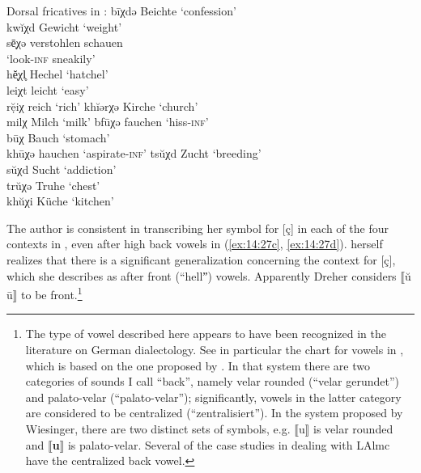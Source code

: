 \ea%
\label{ex:14:27}Dorsal fricatives in :
\ea\label{ex:14:27a} bīχdə \tab [biːçdə] \tab Beichte \tab ‘confession’ \\
    kwĭχd \tab [kvɪçd] \tab Gewicht \tab ‘weight’ \\
    sē̜χə \tab [sɛːçə] \tab verstohlen schauen\\
    \tab \tab  ‘look\textsc{{}-inf} sneakily’ \\
    hĕͅχl̥ \tab [hɛçl̩] \tab Hechel \tab ‘hatchel’ \\
    leiχt \tab [leiçt] \tab leicht \tab ‘easy’ \\
    rẹ̆iχ \tab [rɛiç] \tab  reich \tab ‘rich’ 
\ex\label{ex:14:27b} khĭərχə \tab [kʰɪərçə] \tab Kirche \tab ‘church’ \\
    milχ \tab [milç] \tab Milch \tab ‘milk’ 
\ex\label{ex:14:27c} bfūχə \tab [bfuːçə] \tab fauchen \tab ‘hiss\textsc{{}-inf}’ \\
    būχ \tab [buːç] \tab Bauch \tab ‘stomach’ \\
    khūχə \tab [kʰuːçə] \tab hauchen \tab ‘aspirate\textsc{{}-inf}’ 
\ex\label{ex:14:27d} tsŭχd \tab [tsʊçd] \tab Zucht \tab ‘breeding’ \\
    sŭχd \tab [sʊçd] \tab Sucht \tab ‘addiction’ \\
    trŭχə \tab [trʊçə] \tab Truhe \tab ‘chest’ \\
    khŭχi \tab [kʰʊçi] \tab Küche \tab ‘kitchen’ 
\z 
\z 

The author is consistent in transcribing her symbol for [ç] in each of the four contexts in , even after high back vowels in (\ref{ex:14:27c}, \ref{ex:14:27d}). \citet[74]{Dreher1919} herself realizes that there is a significant generalization concerning the context for [ç], which she describes as after front (“hellˮ) vowels. Apparently Dreher considers ⟦ŭ ū⟧ to be front.\footnote{{The type of vowel described here appears to have been recognized in the literature on German dialectology. See in particular the chart for vowels in \citet[1]{Wiesinger1970a}, which is based on the one proposed by \citet{SchmittWiesinger1964}. In that system there are two categories of sounds I call “back”, namely velar rounded (“velar gerundet”) and palato-velar (“palato-velar”); significantly, vowels in the latter category are considered to be centralized (“zentralisiert”). In the system proposed by Wiesinger, there are two distinct sets of symbols, e.g. ⟦u⟧ is velar rounded and ⟦}\textrm{\textbf{u}}\textrm{⟧ is palato-velar. Several of the case studies in \citet{Wiesinger1970a} dealing with LAlmc have the centralized back vowel.} }

